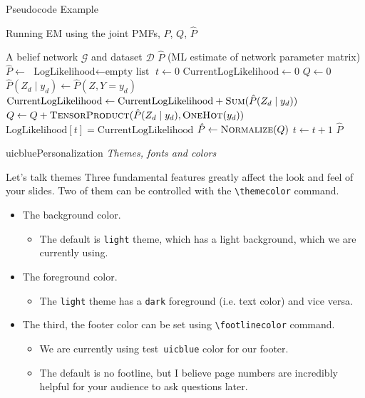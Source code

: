 \documentclass{beamer}
\newcommand{\testcolor}[1]{\colorbox{#1}{\textcolor{#1}{test}}~\texttt{#1}}
\begin{document}
\begin{frame}[fragile]{Pseudocode Example}
\begin{algorithm}[H]
\fontsize{8}{1}\selectfont
\caption{Running EM using the joint PMFs, $P$, $Q$, $\hat P$}
\begin{algorithmic}
\REQUIRE A belief network $\mathcal{G}$ and dataset $ \mathcal{D}$
\ENSURE $\hat P$ (ML estimate of network parameter matrix)
\STATE $\hat P \gets$ 
\STATE $\text{LogLikelihood} \gets \text{empty list}$
\STATE $t \gets 0$
\REPEAT
    \STATE $\text{CurrentLogLikelihood} \gets 0$
    \STATE $Q \gets 0$
        \STATE $\hat P(Z_d \mid y_d) \gets \hat P(Z, Y=y_d)$
        \STATE $\text{CurrentLogLikelihood} \gets \text{CurrentLogLikelihood} + \textsc{Sum}(\hat P(Z_d \mid y_d))$
        \STATE $Q \gets Q + \textsc{TensorProduct}(\hat P(Z_d \mid y_d), \textsc{OneHot}(y_d))$ 
    \ENDFOR
    \STATE $\text{LogLikelihood}[t] = \text{CurrentLogLikelihood}$
    \STATE $\hat P \gets \textsc{Normalize}(Q)$ 
    \STATE $t \gets t + 1$
\RETURN $\hat P$
\end{algorithmic}
\end{algorithm}
\end{frame}



\begin{chapter}{uicblue}{Personalization}
\textit{Themes, fonts and colors}
\end{chapter}


\begin{frame}[fragile]{Let's talk themes}
Three fundamental features greatly affect the look and feel of your slides. Two of them can be controlled with the \verb|\themecolor| command.
\begin{itemize}
\item The background color.
\begin{itemize}
    \item The default is \verb|light| theme, which has a light background, which we are currently using.
\end{itemize}
\item The foreground color.
\begin{itemize}
    \item The \verb|light| theme has a \verb|dark| foreground (i.e. text color) and vice versa.
\end{itemize}
\item The third, the footer color can be set using \verb|\footlinecolor| command.
\begin{itemize}
    \item We are currently using \testcolor{uicblue} color for our footer.
    \item The default is no footline, but I believe page numbers are incredibly helpful for your audience to ask questions later.
\end{itemize}
\end{itemize}
\end{frame}
\end{document}
